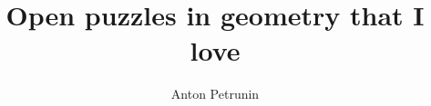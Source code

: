 \documentclass[twoside]{book}
\begin{document}
\title{Open puzzles in geometry that I love}
\author{Anton Petrunin}
\date{}
\maketitle



\thispagestyle{empty}
\tableofcontents
\thispagestyle{empty}

\newpage
\thispagestyle{empty}







\backmatter
\newpage
{}
{\scriptsize

}
\sloppy
\printbibliography[heading=bibintoc]
\fussy
\end{document}
